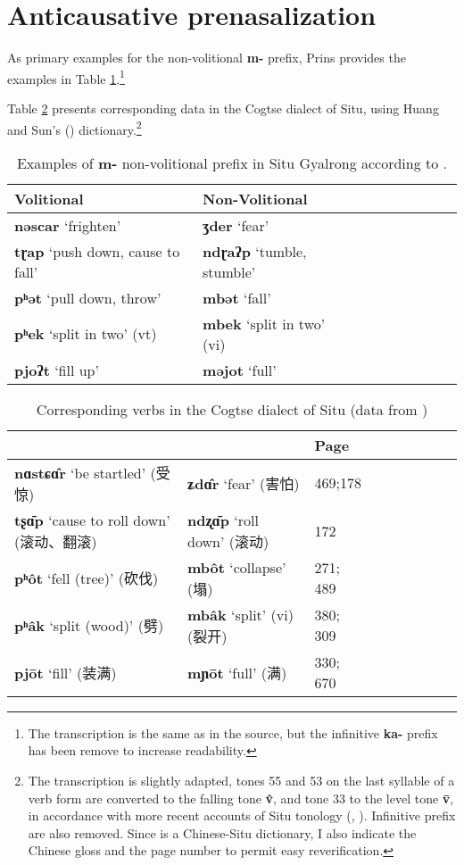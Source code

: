 \documentclass[oneside,a4paper,11pt]{article}
\newcommand{\ipa}[1]{\textbf{{\phon\mbox{#1}}}} %
\newcommand{\zh}[1]{{\cn #1}}
\begin{document}
\section{Anticausative prenasalization}
As primary examples for the non-volitional \ipa{m-} prefix, Prins provides the examples in Table \ref{tab:nonvol}.\footnote{The transcription is the same as in the source, but the infinitive \ipa{ka-} prefix has been remove to increase readability.}

Table \ref{tab:nonvol2} presents corresponding data in the Cogtse dialect of Situ, using Huang and Sun's (\citeyear{huangsun02}) dictionary.\footnote{The transcription is slightly adapted, tones 55 and 53 on the last syllable of a verb form are converted to the falling tone \ipa{v̂}, and tone 33 to the level tone \ipa{v̄}, in accordance with more recent accounts of Situ tonology (\citealt{jackson05yingao}, \citealt{linyj12tone}). Infinitive prefix are also removed. Since \citet{huangsun02} is a Chinese-Situ dictionary, I also indicate the Chinese gloss and the page number to permit easy reverification. }

\begin{table}[h]
\caption{Examples of \ipa{m-} non-volitional prefix in Situ Gyalrong according to \citet[505]{prins16kyomkyo}. } \label{tab:nonvol} \centering
\begin{tabular}{lllllllll}
\toprule
Volitional & Non-Volitional \\
\midrule
\ipa{nəscar} `frighten' & \ipa{ʒder} `fear'  \\
\ipa{tɽap} `push down, cause to fall' & \ipa{ndɽaʔp} `tumble, stumble'  \\
\ipa{pʰət} `pull down, throw' & \ipa{mbət} `fall'  \\
\ipa{pʰek} `split in two' (vt)& \ipa{mbek} `split in two' (vi)  \\
\ipa{pjoʔt} `fill up' & \ipa{məjot} `full'  \\
\bottomrule
\end{tabular}
\end{table}

\begin{table}[h]
\caption{Corresponding verbs in the Cogtse dialect of Situ (data from \citealt{huangsun02})} \label{tab:nonvol2} \centering
\begin{tabular}{lllllllll}
\toprule
&&Page \\
\midrule 
 \ipa{nɑstɕɑ̂r}  `be startled' (\zh{受惊}) &  \ipa{ʑdɑ̂r}  `fear' (\zh{害怕}) &  469;178  \\
\ipa{tʂɑ̄p}   `cause to roll down' (\zh{滚动、翻滚}) &  \ipa{ndʐɑ̄p} `roll down' (\zh{滚动})   &  172  \\
 \ipa{pʰôt} `fell (tree)' (\zh{砍伐}) & \ipa{mbôt} `collapse' (\zh{塌}) & 271; 489 \\
 \ipa{pʰâk} `split (wood)' (\zh{劈}) & \ipa{mbâk} `split' (vi) (\zh{裂开}) & 380; 309 \\
\ipa{pjōt} `fill' (\zh{装满}) & \ipa{mɲōt} `full' (\zh{满}) & 330; 670 \\
\bottomrule
\end{tabular}
\end{table}
\end{document}
